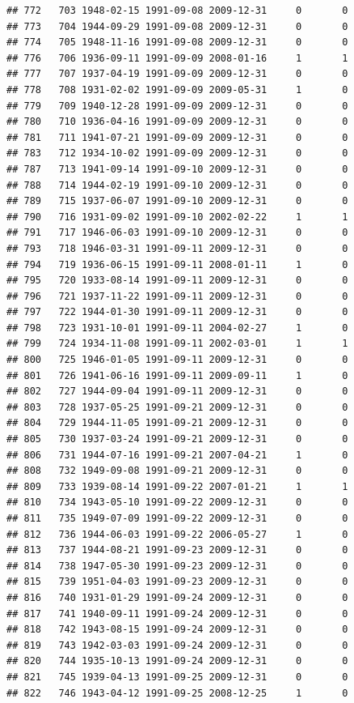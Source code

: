 \documentclass[
]{book}
\begin{document}
\begin{verbatim}
## 772   703 1948-02-15 1991-09-08 2009-12-31     0       0
## 773   704 1944-09-29 1991-09-08 2009-12-31     0       0
## 774   705 1948-11-16 1991-09-08 2009-12-31     0       0
## 776   706 1936-09-11 1991-09-09 2008-01-16     1       1
## 777   707 1937-04-19 1991-09-09 2009-12-31     0       0
## 778   708 1931-02-02 1991-09-09 2009-05-31     1       0
## 779   709 1940-12-28 1991-09-09 2009-12-31     0       0
## 780   710 1936-04-16 1991-09-09 2009-12-31     0       0
## 781   711 1941-07-21 1991-09-09 2009-12-31     0       0
## 783   712 1934-10-02 1991-09-09 2009-12-31     0       0
## 787   713 1941-09-14 1991-09-10 2009-12-31     0       0
## 788   714 1944-02-19 1991-09-10 2009-12-31     0       0
## 789   715 1937-06-07 1991-09-10 2009-12-31     0       0
## 790   716 1931-09-02 1991-09-10 2002-02-22     1       1
## 791   717 1946-06-03 1991-09-10 2009-12-31     0       0
## 793   718 1946-03-31 1991-09-11 2009-12-31     0       0
## 794   719 1936-06-15 1991-09-11 2008-01-11     1       0
## 795   720 1933-08-14 1991-09-11 2009-12-31     0       0
## 796   721 1937-11-22 1991-09-11 2009-12-31     0       0
## 797   722 1944-01-30 1991-09-11 2009-12-31     0       0
## 798   723 1931-10-01 1991-09-11 2004-02-27     1       0
## 799   724 1934-11-08 1991-09-11 2002-03-01     1       1
## 800   725 1946-01-05 1991-09-11 2009-12-31     0       0
## 801   726 1941-06-16 1991-09-11 2009-09-11     1       0
## 802   727 1944-09-04 1991-09-11 2009-12-31     0       0
## 803   728 1937-05-25 1991-09-21 2009-12-31     0       0
## 804   729 1944-11-05 1991-09-21 2009-12-31     0       0
## 805   730 1937-03-24 1991-09-21 2009-12-31     0       0
## 806   731 1944-07-16 1991-09-21 2007-04-21     1       0
## 808   732 1949-09-08 1991-09-21 2009-12-31     0       0
## 809   733 1939-08-14 1991-09-22 2007-01-21     1       1
## 810   734 1943-05-10 1991-09-22 2009-12-31     0       0
## 811   735 1949-07-09 1991-09-22 2009-12-31     0       0
## 812   736 1944-06-03 1991-09-22 2006-05-27     1       0
## 813   737 1944-08-21 1991-09-23 2009-12-31     0       0
## 814   738 1947-05-30 1991-09-23 2009-12-31     0       0
## 815   739 1951-04-03 1991-09-23 2009-12-31     0       0
## 816   740 1931-01-29 1991-09-24 2009-12-31     0       0
## 817   741 1940-09-11 1991-09-24 2009-12-31     0       0
## 818   742 1943-08-15 1991-09-24 2009-12-31     0       0
## 819   743 1942-03-03 1991-09-24 2009-12-31     0       0
## 820   744 1935-10-13 1991-09-24 2009-12-31     0       0
## 821   745 1939-04-13 1991-09-25 2009-12-31     0       0
## 822   746 1943-04-12 1991-09-25 2008-12-25     1       0

\end{verbatim}
\end{document}
